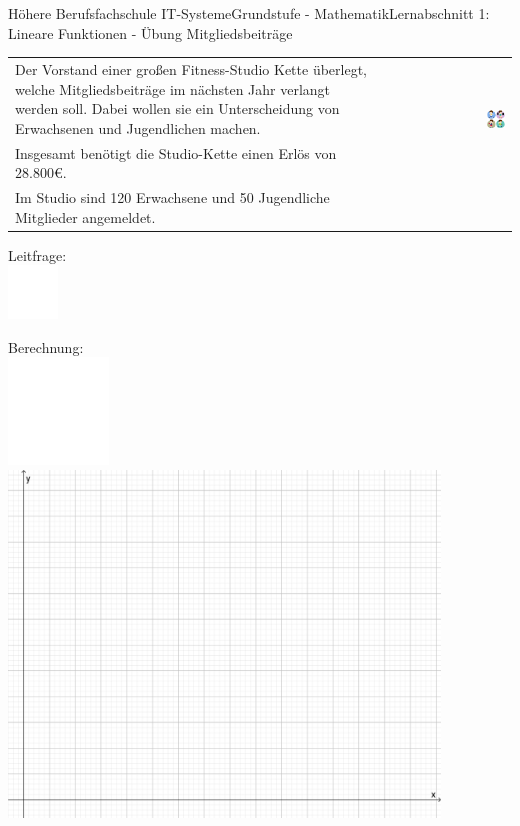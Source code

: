 \documentclass[oneside,openany,headings=optiontotoc,11pt,numbers=noenddot]{scrreprt}
\begin{document}
\begin{worksheet}{Höhere Berufsfachschule IT-Systeme}{Grundstufe - Mathematik}{Lernabschnitt 1: Lineare Funktionen - Übung}
		\setcounter{page}{1}
		\noindent
		\LARGE Mitgliedsbeiträge\\
		\normalsize
		\noindent
		\begin{tabularx}{\textwidth}{Xr}
			Der Vorstand einer großen Fitness-Studio Kette überlegt, welche Mitgliedsbeiträge im nächsten Jahr verlangt werden soll. Dabei wollen sie ein Unterscheidung von Erwachsenen und Jugendlichen machen. & \multirow{2}{*}{\includegraphics[width=0.15\textwidth,align=b]{../99_Bilder/sporty.jpg}}\\
			Insgesamt benötigt die Studio-Kette einen Erlös von \(28.800\)\euro{}. & \\
			Im Studio sind 120 Erwachsene und 50 Jugendliche Mitglieder angemeldet.
		\end{tabularx}
		\begin{framed}
			\noindent
			\small{\color{codegray}Leitfrage:}\\
			\includegraphics[width=0.1\textwidth]{../../empty.jpg}\\
		\end{framed}
		\begin{framed}
			\noindent
			\small{\color{codegray}Berechnung:}\\
			\includegraphics[width=0.2\textwidth]{../../empty.jpg}\\
			\includegraphics[width=0.86\textwidth]{../99_Bilder/KoordLeer.png}

\end{framed}
\end{worksheet}
\end{document}
